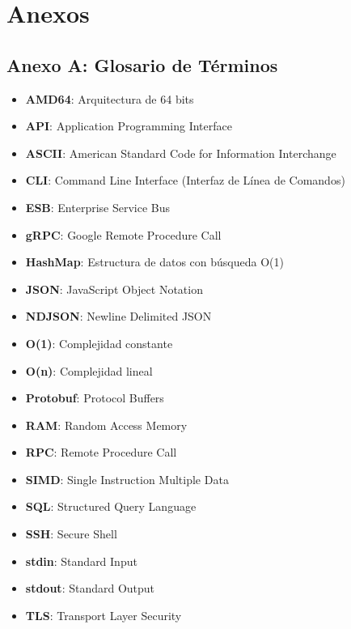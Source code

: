 \chapter{Anexos}

\section{Anexo A: Glosario de Términos}

\begin{itemize}
    \item \textbf{AMD64}: Arquitectura de 64 bits
    \item \textbf{API}: Application Programming Interface
    \item \textbf{ASCII}: American Standard Code for Information Interchange
    \item \textbf{CLI}: Command Line Interface (Interfaz de Línea de Comandos)
    \item \textbf{ESB}: Enterprise Service Bus
    \item \textbf{gRPC}: Google Remote Procedure Call
    \item \textbf{HashMap}: Estructura de datos con búsqueda O(1)
    \item \textbf{JSON}: JavaScript Object Notation
    \item \textbf{NDJSON}: Newline Delimited JSON
    \item \textbf{O(1)}: Complejidad constante
    \item \textbf{O(n)}: Complejidad lineal
    \item \textbf{Protobuf}: Protocol Buffers
    \item \textbf{RAM}: Random Access Memory
    \item \textbf{RPC}: Remote Procedure Call
    \item \textbf{SIMD}: Single Instruction Multiple Data
    \item \textbf{SQL}: Structured Query Language
    \item \textbf{SSH}: Secure Shell
    \item \textbf{stdin}: Standard Input
    \item \textbf{stdout}: Standard Output
    \item \textbf{TLS}: Transport Layer Security
\end{itemize}

